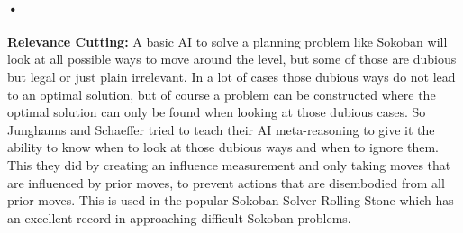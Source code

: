 \documentclass{report}
\begin{document}
\paragraph*{•}
\textbf{Relevance Cutting:} A basic AI to solve a planning problem like Sokoban will look at all possible ways to move around the level, but some of those are dubious but legal or just plain irrelevant. In a lot of cases those dubious ways do not lead to an optimal solution, but of course a problem can be constructed where the optimal solution can only be found when looking at those dubious cases. So Junghanns and Schaeffer tried to teach their AI meta-reasoning to give it the ability to know when to look at those dubious ways and when to ignore them. This they did by creating an influence measurement and only taking moves that are influenced by prior moves, to prevent actions that are disembodied from all prior moves. This is used in the popular Sokoban Solver Rolling Stone which has an excellent record in approaching difficult Sokoban problems.
\end{document}
